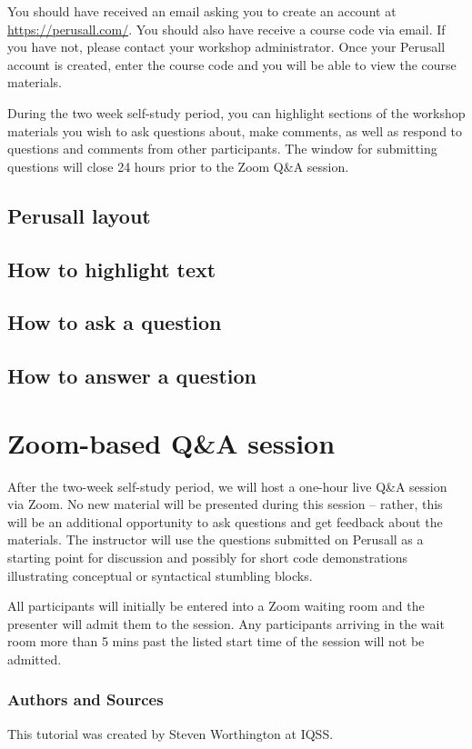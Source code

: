 \documentclass[]{book}
\begin{document}
You should have received an email asking you to create an account at \url{https://perusall.com/}. You should also have receive a course code via email. If you have not, please contact your workshop administrator. Once your Perusall account is created, enter the course code and you will be able to view the course materials.

During the two week self-study period, you can highlight sections of the workshop materials you wish to ask questions about, make comments, as well as respond to questions and comments from other participants. The window for submitting questions will close 24 hours prior to the Zoom Q\&A session.

\hypertarget{perusall-layout}{%
\section{Perusall layout}\label{perusall-layout}}

\hypertarget{how-to-highlight-text}{%
\section{How to highlight text}\label{how-to-highlight-text}}

\hypertarget{how-to-ask-a-question}{%
\section{How to ask a question}\label{how-to-ask-a-question}}

\hypertarget{how-to-answer-a-question}{%
\section{How to answer a question}\label{how-to-answer-a-question}}

\hypertarget{zoom-based-qa-session}{%
\chapter{Zoom-based Q\&A session}\label{zoom-based-qa-session}}

After the two-week self-study period, we will host a one-hour live Q\&A session via Zoom. No new material will be presented during this session -- rather, this will be an additional opportunity to ask questions and get feedback about the materials. The instructor will use the questions submitted on Perusall as a starting point for discussion and possibly for short code demonstrations illustrating conceptual or syntactical stumbling blocks.

All participants will initially be entered into a Zoom waiting room and the presenter will admit them to the session. Any participants arriving in the wait room more than 5 mins past the listed start time of the session will not be admitted.

\hypertarget{authors-and-sources}{%
\subsection*{Authors and Sources}\label{authors-and-sources}}

This tutorial was created by Steven Worthington at IQSS.
\end{document}
